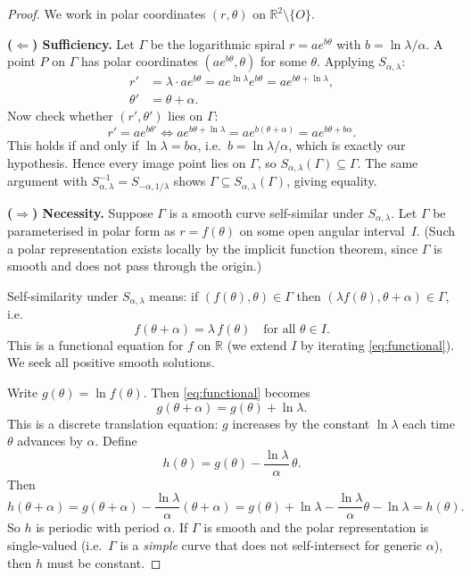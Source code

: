 \begin{proof}
We work in polar coordinates \((r,\theta)\) on
\(\mathbb{R}^2 \setminus \{O\}\).

\medskip
\noindent\textbf{(\(\Leftarrow\)) Sufficiency.}
Let \(\Gamma\) be the logarithmic spiral \(r = ae^{b\theta}\)
with \(b = \ln\lambda/\alpha\).  A point \(P\) on \(\Gamma\) has
polar coordinates \((ae^{b\theta}, \theta)\) for some \(\theta\).
Applying \(S_{\alpha,\lambda}\):
\begin{align}
  r' &= \lambda \cdot a e^{b\theta} = a e^{\ln\lambda} e^{b\theta}
     = a e^{b\theta + \ln\lambda}, \label{eq:suffr}\\
  \theta' &= \theta + \alpha. \label{eq:sufft}
\end{align}
Now check whether \((r', \theta')\) lies on \(\Gamma\):
\[
  r' = ae^{b\theta'}\iff ae^{b\theta+\ln\lambda}
     = ae^{b(\theta+\alpha)} = ae^{b\theta+b\alpha}.
\]
This holds if and only if \(\ln\lambda = b\alpha\), i.e.\
\(b = \ln\lambda/\alpha\), which is exactly our hypothesis.
Hence every image point lies on \(\Gamma\), so
\(S_{\alpha,\lambda}(\Gamma) \subseteq \Gamma\).  The same
argument with \(S_{\alpha,\lambda}^{-1} = S_{-\alpha,1/\lambda}\)
shows \(\Gamma \subseteq S_{\alpha,\lambda}(\Gamma)\), giving
equality.

\medskip
\noindent\textbf{(\(\Rightarrow\)) Necessity.}
Suppose \(\Gamma\) is a smooth curve self-similar under
\(S_{\alpha,\lambda}\).  Let \(\Gamma\) be parameterised in polar
form as \(r = f(\theta)\) on some open angular interval~\(I\).
(Such a polar representation exists locally by the implicit
function theorem, since \(\Gamma\) is smooth and does not pass
through the origin.)

Self-similarity under \(S_{\alpha,\lambda}\) means: if
\((f(\theta), \theta) \in \Gamma\) then \((\lambda f(\theta),
\theta + \alpha) \in \Gamma\), i.e.\
\begin{equation}\label{eq:functional}
  f(\theta + \alpha) = \lambda\, f(\theta) \quad
  \text{for all } \theta \in I.
\end{equation}
This is a functional equation for \(f\) on \(\mathbb{R}\) (we
extend \(I\) by iterating \eqref{eq:functional}).  We seek all
positive smooth solutions.

Write \(g(\theta) = \ln f(\theta)\).  Then
\eqref{eq:functional} becomes
\begin{equation}\label{eq:gshift}
  g(\theta + \alpha) = g(\theta) + \ln\lambda.
\end{equation}
This is a discrete translation equation: \(g\) increases by the
constant \(\ln\lambda\) each time \(\theta\) advances by
\(\alpha\).  Define
\[
  h(\theta) = g(\theta) - \frac{\ln\lambda}{\alpha}\,\theta.
\]
Then
\[
  h(\theta + \alpha) = g(\theta+\alpha) - \frac{\ln\lambda}{\alpha}(\theta+\alpha)
  = g(\theta) + \ln\lambda - \frac{\ln\lambda}{\alpha}\theta - \ln\lambda
  = h(\theta).
\]
So \(h\) is periodic with period \(\alpha\).  If \(\Gamma\) is
smooth and the polar representation is single-valued (i.e.\
\(\Gamma\) is a \emph{simple} curve that does not self-intersect
for generic \(\alpha\)), then \(h\) must be constant.


\end{proof}
